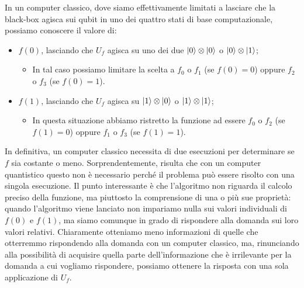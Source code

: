 \noindent In un computer classico, dove siamo effettivamente limitati a lasciare che la black-box agisca sui qubit in uno dei quattro stati di base computazionale, possiamo conoscere il valore di:
\begin{itemize}
    \item $f(0)$, lasciando che $U_f$ agisca su uno dei due $\ket0 \otimes \ket0$ o $\ket0 \otimes \ket1$;
    \begin{itemize}
        \item In tal caso possiamo limitare la scelta a $f_0$ o $f_1$ (se $f(0) = 0$) oppure $f_2$ o $f_3$ (se $f(0) = 1$).
    \end{itemize}
    \item $f(1)$, lasciando che $U_f$ agisca su $\ket1 \otimes \ket0$ o $\ket1 \otimes \ket1$;
    \begin{itemize}
        \item In questa situazione abbiamo ristretto la funzione ad essere $f_0$ o $f_2$ (se $f(1) = 0$) oppure $f_1$ o $f_3$ (se $f(1) = 1$).
    \end{itemize}
\end{itemize}
In definitiva, un computer classico necessita di due esecuzioni per determinare se $f$ sia costante o meno. Sorprendentemente, risulta che con un computer quantistico questo non è necessario perché il problema può essere risolto con una singola esecuzione. Il punto interessante è che l'algoritmo non riguarda il calcolo preciso della funzione, ma piuttosto la comprensione di una o più sue proprietà: quando l'algoritmo viene lanciato non impariamo nulla sui valori individuali di $f(0)$ e $f(1)$, ma siamo comunque in grado di rispondere alla domanda sui loro valori relativi. Chiaramente otteniamo meno informazioni di quelle che otterremmo rispondendo alla domanda con un computer classico, ma, rinunciando alla possibilità di acquisire quella parte dell'informazione che è irrilevante per la domanda a cui vogliamo rispondere, possiamo ottenere la risposta con una sola applicazione di $U_f$.

